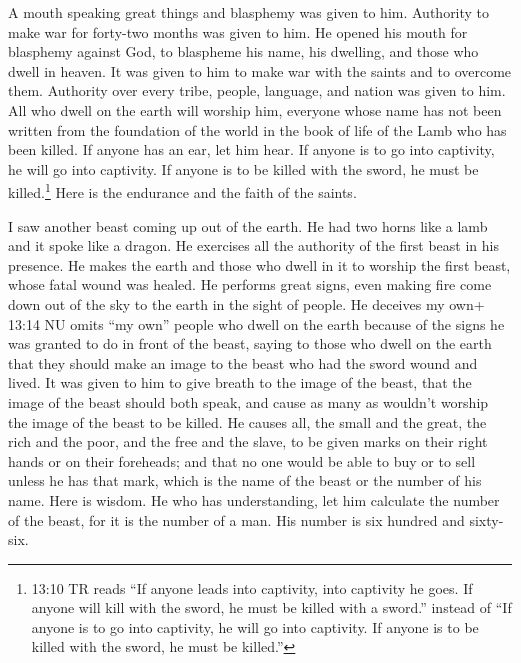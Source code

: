  A mouth speaking great things and blasphemy was given to
him. Authority to make war for forty-two months was given to him.
 He opened his mouth for blasphemy against God, to blaspheme
his name, his dwelling, and those who dwell in heaven.  It
was given to him to make war with the saints and to overcome them.
Authority over every tribe, people, language, and nation was given to
him.  All who dwell on the earth will worship him, everyone
whose name has not been written from the foundation of the world in the
book of life of the Lamb who has been killed.  If anyone has
an ear, let him hear.  If anyone is to go into captivity,
he will go into captivity. If anyone is to be killed with the sword, he
must be killed.\footnote{13:10 TR reads ``If anyone leads into
  captivity, into captivity he goes. If anyone will kill with the sword,
  he must be killed with a sword.'' instead of ``If anyone is to go into
  captivity, he will go into captivity. If anyone is to be killed with
  the sword, he must be killed.''} Here is the endurance and the faith
of the saints.

 I saw another beast coming up out of the earth. He had two
horns like a lamb and it spoke like a dragon.  He exercises
all the authority of the first beast in his presence. He makes the earth
and those who dwell in it to worship the first beast, whose fatal wound
was healed.  He performs great signs, even making fire come
down out of the sky to the earth in the sight of people. 
He deceives my own+ 13:14 NU omits ``my own'' people who dwell on the
earth because of the signs he was granted to do in front of the beast,
saying to those who dwell on the earth that they should make an image to
the beast who had the sword wound and lived.  It was given
to him to give breath to the image of the beast, that the image of the
beast should both speak, and cause as many as wouldn't worship the image
of the beast to be killed.  He causes all, the small and
the great, the rich and the poor, and the free and the slave, to be
given marks on their right hands or on their foreheads; 
and that no one would be able to buy or to sell unless he has that mark,
which is the name of the beast or the number of his name. 
Here is wisdom. He who has understanding, let him calculate the number
of the beast, for it is the number of a man. His number is six hundred
and sixty-six.

